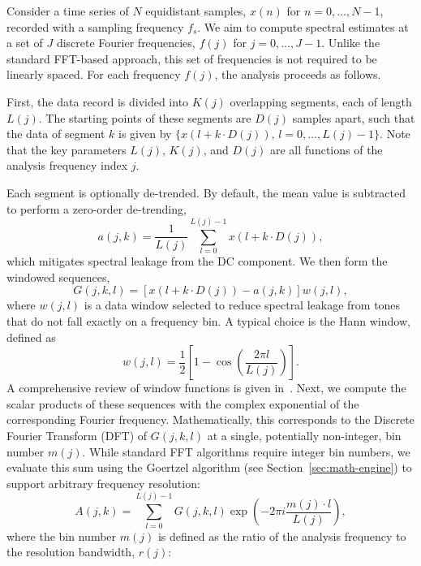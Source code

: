 \documentclass[final, 5p, times, twocolumn, number, sort&compress]{elsarticle}
\begin{document}
Consider a time series of $N$ equidistant samples, $x(n)$ for $n=0, \dots, N-1$, recorded with a sampling frequency $f_s$. We aim to compute spectral estimates at a set of $J$ discrete Fourier frequencies, $f(j)$ for $j=0, \dots, J-1$. Unlike the standard FFT-based approach, this set of frequencies is not required to be linearly spaced. For each frequency $f(j)$, the analysis proceeds as follows.

First, the data record is divided into $K(j)$ overlapping segments, each of length $L(j)$. The starting points of these segments are $D(j)$ samples apart, such that the data of segment $k$ is given by $\{ x(l + k \cdot D(j)),\,l=0,\dots,L(j)-1 \}$. Note that the key parameters $L(j)$, $K(j)$, and $D(j)$ are all functions of the analysis frequency index $j$.

Each segment is optionally de-trended. By default, the mean value is subtracted to perform a zero-order de-trending,
\begin{equation}
a(j,k) = \frac{1}{L(j)} \sum \limits_{l=0}^{L(j)-1} x(l + k \cdot D(j)),
\end{equation}
which mitigates spectral leakage from the DC component. We then form the windowed sequences,
\begin{equation}
G(j,k,l) = \left[ x(l + k \cdot D(j)) - a(j,k) \right] w(j,l),
\end{equation}
where $w(j,l)$ is a data window selected to reduce spectral leakage from tones that do not fall exactly on a frequency bin. A typical choice is the Hann window, defined as
\begin{equation}
w(j,l) = \frac{1}{2}\left[ 1- \cos \left( \frac{2 \pi l}{L(j)} \right) \right].
\end{equation}
A comprehensive review of window functions is given in~\cite{Heinzel2002TN}. Next, we compute the scalar products of these sequences with the complex exponential of the corresponding Fourier frequency. Mathematically, this corresponds to the Discrete Fourier Transform (DFT) of $G(j,k,l)$ at a single, potentially non-integer, bin number $m(j)$. While standard FFT algorithms require integer bin numbers, we evaluate this sum using the Goertzel algorithm (see Section~\ref{sec:math-engine}) to support arbitrary frequency resolution:
\begin{equation}
A(j,k) = \sum \limits_{l=0}^{L(j)-1} G(j,k,l) \exp \left( -2\pi i \frac{m(j) \cdot l}{L(j)} \right),
\end{equation}
where the bin number $m(j)$ is defined as the ratio of the analysis frequency to the resolution bandwidth, $r(j)$:
\end{document}
